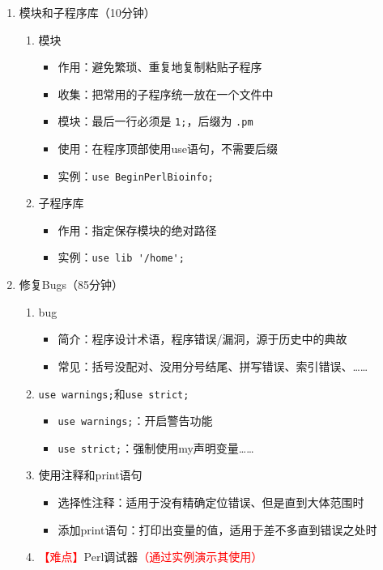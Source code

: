 \documentclass{TIJMUjiaoanLL}
\begin{document}
\begin{enumerate}
  \item 模块和子程序库（10分钟）
    \begin{enumerate}
      \item 模块
        \begin{itemize}
           \item 作用：避免繁琐、重复地复制粘贴子程序
           \item 收集：把常用的子程序统一放在一个文件中
	   \item 模块：最后一行必须是 \verb|1;|，后缀为 \verb|.pm|
	   \item 使用：在程序顶部使用use语句，不需要后缀
	   \item 实例：\verb|use BeginPerlBioinfo;|
        \end{itemize}
      \item 子程序库
	\begin{itemize}
	  \item 作用：指定保存模块的绝对路径
	  \item 实例：\verb|use lib '/home';|
	\end{itemize}
    \end{enumerate}
  \item 修复Bugs（85分钟）
    \begin{enumerate}
      \item bug
	\begin{itemize}
	  \item 简介：程序设计术语，程序错误/漏洞，源于历史中的典故
	  \item 常见：括号没配对、没用分号结尾、拼写错误、索引错误、……
	\end{itemize}
      \item \verb|use warnings;|和\verb|use strict;|
	\begin{itemize}
	  \item \verb|use warnings;|：开启警告功能
	  \item \verb|use strict;|：强制使用my声明变量……
	\end{itemize}
      \item 使用注释和print语句
	\begin{itemize}
	  \item 选择性注释：适用于没有精确定位错误、但是直到大体范围时
	  \item 添加print语句：打印出变量的值，适用于差不多直到错误之处时
	\end{itemize}
      \item \textcolor{red}{【难点】}Perl调试器\textcolor{red}{（通过实例演示其使用）}
	\begin{itemize}

\end{itemize}
\end{enumerate}
\end{enumerate}
\end{document}
